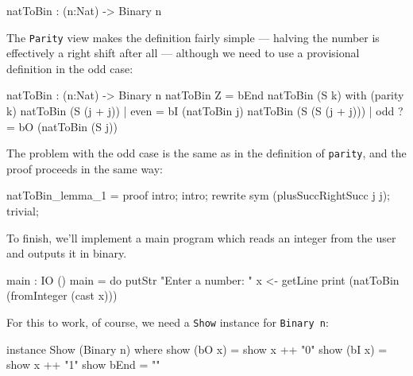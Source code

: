 \begin{code}
natToBin : (n:Nat) -> Binary n
\end{code}

\noindent
The \texttt{Parity} view makes the definition fairly simple --- halving the number is effectively a right shift after all --- although we need to use a provisional definition in the odd case:

\begin{code}
natToBin : (n:Nat) -> Binary n
natToBin Z = bEnd
natToBin (S k) with (parity k)
   natToBin (S (j + j))     | even  = bI (natToBin j)
   natToBin (S (S (j + j))) | odd  ?= bO (natToBin (S j))
\end{code}

\noindent
The problem with the odd case is the same as in the definition of \texttt{parity}, and the proof proceeds in the same way:

\begin{code}
natToBin_lemma_1 = proof {
    intro;
    intro;
    rewrite sym (plusSuccRightSucc j j);
    trivial;
}
\end{code}

\noindent
To finish, we'll implement a main program which reads an integer from the user and outputs it in binary. 

\begin{code}
main : IO ()
main = do putStr "Enter a number: "
          x <- getLine
          print (natToBin (fromInteger (cast x)))
\end{code}

\noindent
For this to work, of course, we need a \texttt{Show} instance for \texttt{Binary n}:

\begin{code}
instance Show (Binary n) where
    show (bO x) = show x ++ "0"
    show (bI x) = show x ++ "1"
    show bEnd = ""
\end{code}

